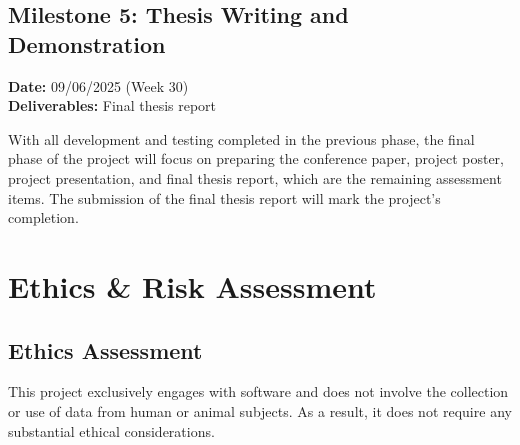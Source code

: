 \subsection{Milestone 5: Thesis Writing and Demonstration}
\textbf{Date:} 09/06/2025 (Week 30) \\
\textbf{Deliverables:} Final thesis report

With all development and testing completed in the previous phase, the final phase of the project will focus on preparing the conference paper, project poster, project presentation, and final thesis report, which are the remaining assessment items. The submission of the final thesis report will mark the project's completion.

\newpage

\section{Ethics \& Risk Assessment}
\subsection{Ethics Assessment}
This project exclusively engages with software and does not involve the collection or use of data from human or animal subjects. As a result, it does not require any substantial ethical considerations.
